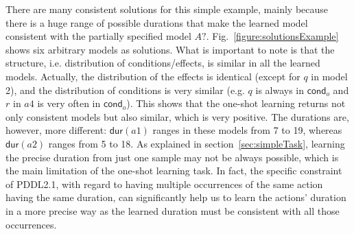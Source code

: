 \documentclass{ecai}
\newcommand{\cond}{\mathsf{cond}}  %
\newcommand{\dur}{\mathsf{dur}}    %
\begin{document}
There are many consistent solutions for this simple example, mainly because there is a huge range of possible durations that make the learned model consistent with the partially specified model $A?$.
Fig.~\ref{figure:solutionsExample} shows six arbitrary models as solutions. What is important to note is that the structure, i.e. distribution of conditions/effects, is similar in all the learned models. Actually, the distribution of the effects is identical (except for $q$ in model 2), and the distribution of conditions is very similar (e.g. $q$ is always in $\cond_o$ and $r$ in $a4$ is very often in $\cond_o$).
This shows that the one-shot learning returns not only consistent models but also similar, which is very positive.
The durations are, however, more different: $\dur(a1)$ ranges in these models from 7 to 19, whereas $\dur(a2)$ ranges from 5 to 18. As explained in section~\ref{sec:simpleTask}, learning the precise duration from just one sample may not be always possible, which is the main limitation of the one-shot learning task.
In fact, the specific constraint of PDDL2.1, with regard to having multiple occurrences of the same action having the same duration, can significantly help us to learn the actions' duration in a more precise way as the learned duration must be consistent with all those occurrences.
\end{document}
